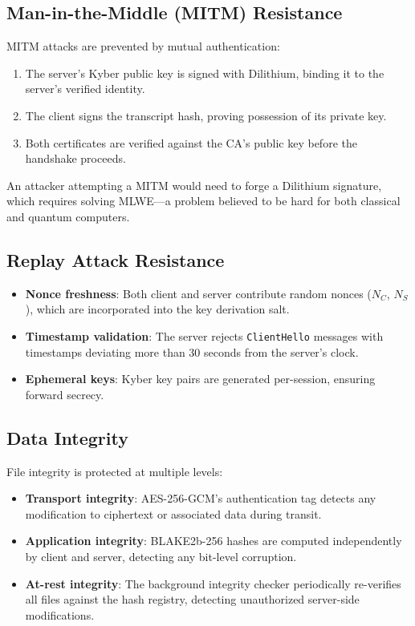 \documentclass[12pt, a4paper]{article}
\begin{document}
\subsection{Man-in-the-Middle (MITM) Resistance}

MITM attacks are prevented by mutual authentication:

\begin{enumerate}[label=\arabic*., itemsep=2pt]
    \item The server's Kyber public key is signed with Dilithium, binding it to the server's verified identity.
    \item The client signs the transcript hash, proving possession of its private key.
    \item Both certificates are verified against the CA's public key before the handshake proceeds.
\end{enumerate}

An attacker attempting a MITM would need to forge a Dilithium signature, which requires solving MLWE—a problem believed to be hard for both classical and quantum computers.

\subsection{Replay Attack Resistance}

\begin{itemize}[itemsep=2pt]
    \item \textbf{Nonce freshness}: Both client and server contribute random nonces ($N_C$, $N_S$), which are incorporated into the key derivation salt.
    \item \textbf{Timestamp validation}: The server rejects \texttt{ClientHello} messages with timestamps deviating more than 30 seconds from the server's clock.
    \item \textbf{Ephemeral keys}: Kyber key pairs are generated per-session, ensuring forward secrecy.
\end{itemize}

\subsection{Data Integrity}

File integrity is protected at multiple levels:

\begin{itemize}[itemsep=2pt]
    \item \textbf{Transport integrity}: AES-256-GCM's authentication tag detects any modification to ciphertext or associated data during transit.
    \item \textbf{Application integrity}: BLAKE2b-256 hashes are computed independently by client and server, detecting any bit-level corruption.
    \item \textbf{At-rest integrity}: The background integrity checker periodically re-verifies all files against the hash registry, detecting unauthorized server-side modifications.
\end{itemize}
\end{document}
